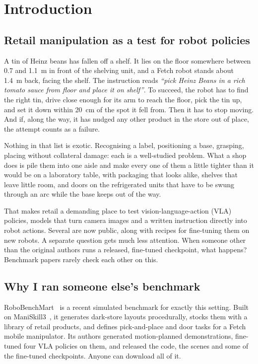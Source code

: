 \chapter{Introduction}
\label{chap:introduction}
\begingroup
\justifying
\setlength{\parindent}{2em}
\setlength{\parskip}{0.55\baselineskip}

\section{Retail manipulation as a test for robot policies}

A tin of Heinz beans has fallen off a shelf. It lies on the floor somewhere between 0.7 and 1.1~m in front of the shelving unit, and a Fetch robot stands about 1.4~m back, facing the shelf. The instruction reads \emph{``pick Heinz Beans in a rich tomato sauce from floor and place it on shelf''}. To succeed, the robot has to find the right tin, drive close enough for its arm to reach the floor, pick the tin up, and set it down within 20~cm of the spot it fell from. Then it has to stop moving. And if, along the way, it has nudged any other product in the store out of place, the attempt counts as a failure.

Nothing in that list is exotic. Recognising a label, positioning a base, grasping, placing without collateral damage: each is a well-studied problem. What a shop does is pile them into one aisle and make every one of them a little tighter than it would be on a laboratory table, with packaging that looks alike, shelves that leave little room, and doors on the refrigerated units that have to be swung through an arc while the base keeps out of the way.

That makes retail a demanding place to test vision-language-action (VLA) policies, models that turn camera images and a written instruction directly into robot actions. Several are now public, along with recipes for fine-tuning them on new robots. A separate question gets much less attention. When someone other than the original authors runs a released, fine-tuned checkpoint, what happens? Benchmark papers rarely check each other on this.

\section{Why I ran someone else's benchmark}

RoboBenchMart~\cite{soshin2025robobenchmart} is a recent simulated benchmark for exactly this setting. Built on ManiSkill3~\cite{taomaniskill3}, it generates dark-store layouts procedurally, stocks them with a library of retail products, and defines pick-and-place and door tasks for a Fetch mobile manipulator. Its authors generated motion-planned demonstrations, fine-tuned four VLA policies on them, and released the code, the scenes and some of the fine-tuned checkpoints. Anyone can download all of it.


